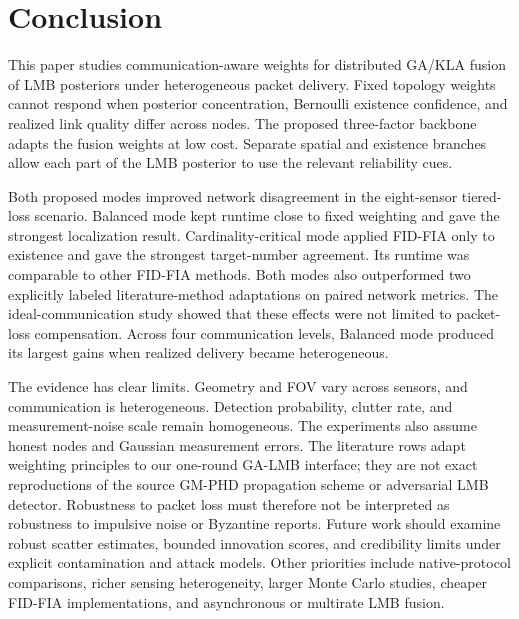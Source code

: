 \section{Conclusion}
\label{sec:conclusion}

This paper studies communication-aware weights for distributed GA/KLA fusion of LMB posteriors under heterogeneous packet delivery. Fixed topology weights cannot respond when posterior concentration, Bernoulli existence confidence, and realized link quality differ across nodes. The proposed three-factor backbone adapts the fusion weights at low cost. Separate spatial and existence branches allow each part of the LMB posterior to use the relevant reliability cues.

Both proposed modes improved network disagreement in the eight-sensor tiered-loss scenario. Balanced mode kept runtime close to fixed weighting and gave the strongest localization result. Cardinality-critical mode applied FID-FIA only to existence and gave the strongest target-number agreement. Its runtime was comparable to other FID-FIA methods. Both modes also outperformed two explicitly labeled literature-method adaptations on paired network metrics. The ideal-communication study showed that these effects were not limited to packet-loss compensation. Across four communication levels, Balanced mode produced its largest gains when realized delivery became heterogeneous.

The evidence has clear limits. Geometry and FOV vary across sensors, and communication is heterogeneous. Detection probability, clutter rate, and measurement-noise scale remain homogeneous. The experiments also assume honest nodes and Gaussian measurement errors. The literature rows adapt weighting principles to our one-round GA-LMB interface; they are not exact reproductions of the source GM-PHD propagation scheme or adversarial LMB detector. Robustness to packet loss must therefore not be interpreted as robustness to impulsive noise or Byzantine reports. Future work should examine robust scatter estimates, bounded innovation scores, and credibility limits under explicit contamination and attack models. Other priorities include native-protocol comparisons, richer sensing heterogeneity, larger Monte Carlo studies, cheaper FID-FIA implementations, and asynchronous or multirate LMB fusion.
